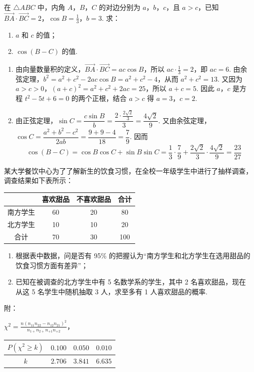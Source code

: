 \begin{problem}
在 \(\triangle ABC\) 中，内角 \(A\)，\(B\)，\(C\) 的对边分别为 \(a\)，\(b\)，\(c\)，且 \(a > c\)，已知 \(\overrightarrow{BA} \cdot \overrightarrow{BC} = 2\)，\(\cos B = \frac{1}{3}\)，\(b = 3\). 求：
\begin{enumerate}
\item \(a\) 和 \(c\) 的值；
\item \(\cos(B-C)\) 的值.
\end{enumerate}
\end{problem}

\begin{solution}
\begin{enumerate}
\item 由向量数量积的定义，\(\overrightarrow{BA} \cdot \overrightarrow{BC}=ac\cos B\)，所以 \(ac\cdot\frac{1}{3}=2\)，即 \(ac=6\). 由余弦定理，\(b^{2}=a^{2}+c^{2}-2ac\cos B=a^{2}+c^{2}-4\)，从而 \(a^{2}+c^{2}=13\). 又因为 \(a>c>0\)，\((a+c)^{2}=a^{2}+c^{2}+2ac=25\)，所以 \(a+c=5\). 因此 \(a\)，\(c\) 是方程 \(t^{2}-5t+6=0\) 的两个正根，结合 \(a>c\) 得 \(a=3\)，\(c=2\).
\item 由正弦定理，\(\sin C=\dfrac{c\sin B}{b}=\dfrac{2\cdot\frac{2\sqrt{2}}{3}}{3}=\dfrac{4\sqrt{2}}{9}\). 又由余弦定理，\(\cos C=\dfrac{a^{2}+b^{2}-c^{2}}{2ab}=\dfrac{9+9-4}{18}=\dfrac{7}{9}\). 因而
\[
\cos(B-C)=\cos B\cos C+\sin B\sin C=\frac{1}{3}\cdot\frac{7}{9}+\frac{2\sqrt{2}}{3}\cdot\frac{4\sqrt{2}}{9}=\frac{23}{27}
\]
\end{enumerate}
\end{solution}

\begin{problem}
某大学餐饮中心为了了解新生的饮食习惯，在全校一年级学生中进行了抽样调查，调查结果如下表所示：

\begin{center}
\begin{tabular}{c|ccc}
 & 喜欢甜品 & 不喜欢甜品 & 合计 \\ \hline
南方学生 & 60 & 20 & 80 \\
北方学生 & 10 & 10 & 20 \\
合计 & 70 & 30 & 100
\end{tabular}
\end{center}

\begin{enumerate}
\item 根据表中数据，问是否有 95\% 的把握认为“南方学生和北方学生在选用甜品的饮食习惯方面有差异”；
\item 已知在被调查的北方学生中有 5 名数学系的学生，其中 2 名喜欢甜品，现在从这 5 名学生中随机抽取 3 人，求至多有 1 人喜欢甜品的概率.
\end{enumerate}

附：
\begin{center}
\(\displaystyle \chi^2 = \frac{n\left(n_{11}n_{22} - n_{12}n_{21}\right)^2}{n_{1+}n_{2+}n_{+1}n_{+2}}\)，
\qquad
\begin{tabular}{c|ccc}
\(P(\chi^2 \geqslant k)\) & \(0.100\) & \(0.050\) & \(0.010\) \\ \hline
\(k\) & \(2.706\) & \(3.841\) & \(6.635\)
\end{tabular}
\end{center}
\end{problem}

